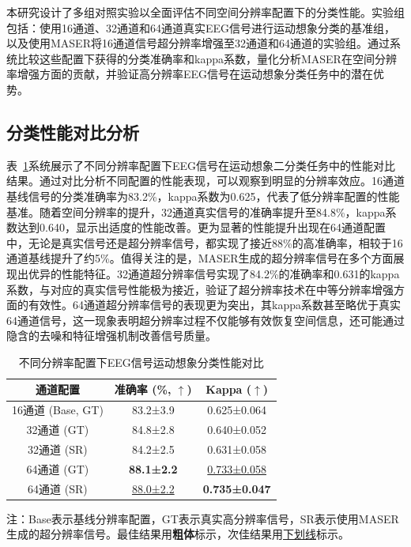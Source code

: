 本研究设计了多组对照实验以全面评估不同空间分辨率配置下的分类性能。实验组包括：使用16通道、32通道和64通道真实EEG信号进行运动想象分类的基准组，以及使用MASER将16通道信号超分辨率增强至32通道和64通道的实验组。通过系统比较这些配置下获得的分类准确率和kappa系数，量化分析MASER在空间分辨率增强方面的贡献，并验证高分辨率EEG信号在运动想象分类任务中的潜在优势。

\subsection{分类性能对比分析}

表~\ref{tab:TC3-5}系统展示了不同分辨率配置下EEG信号在运动想象二分类任务中的性能对比结果。通过对比分析不同配置的性能表现，可以观察到明显的分辨率效应。16通道基线信号的分类准确率为83.2\%，kappa系数为0.625，代表了低分辨率配置的性能基准。随着空间分辨率的提升，32通道真实信号的准确率提升至84.8\%，kappa系数达到0.640，显示出适度的性能改善。更为显著的性能提升出现在64通道配置中，无论是真实信号还是超分辨率信号，都实现了接近88\%的高准确率，相较于16通道基线提升了约5\%。值得关注的是，MASER生成的超分辨率信号在多个方面展现出优异的性能特征。32通道超分辨率信号实现了84.2\%的准确率和0.631的kappa系数，与对应的真实信号性能极为接近，验证了超分辨率技术在中等分辨率增强方面的有效性。64通道超分辨率信号的表现更为突出，其kappa系数甚至略优于真实64通道信号，这一现象表明超分辨率过程不仅能够有效恢复空间信息，还可能通过隐含的去噪和特征增强机制改善信号质量。

\begin{table}[htb]
\centering
\caption{不同分辨率配置下EEG信号运动想象分类性能对比}
\begin{tabular}{ccc}
\toprule
通道配置 & 准确率 (\%, $\uparrow$) & Kappa ($\uparrow$) \\
\midrule
16通道 (Base, GT) & 83.2±3.9 & 0.625±0.064 \\  \midrule
32通道 (GT) & 84.8±2.8 & 0.640±0.052 \\
32通道 (SR) & 84.2±2.5 & 0.631±0.058 \\ \midrule
64通道 (GT) & \textbf{88.1±2.2} & \uline{0.733±0.058} \\
64通道 (SR) & \uline{88.0±2.2} & \textbf{0.735±0.047} \\
\bottomrule
\end{tabular}
\begin{tablenotes}
\footnotesize
\item[]\centering 注：Base表示基线分辨率配置，GT表示真实高分辨率信号，SR表示使用MASER生成的超分辨率信号。最佳结果用\textbf{粗体}标示，次佳结果用\underline{下划线}标示。
\end{tablenotes}
\label{tab:TC3-5}
\end{table}

